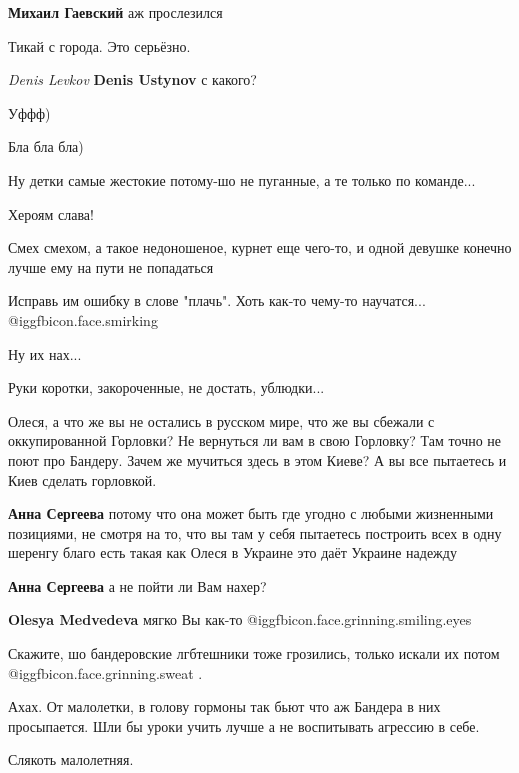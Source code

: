 \begin{itemize}
\begin{itemize}
\textbf{Михаил Гаевский} аж прослезился
\end{itemize} %

Тикай с города. Это серьёзно.

\emph{Denis Levkov}
\textbf{Denis Ustynov} с какого?

Уффф)

Бла бла бла)

Ну детки самые жестокие потому-шо не пуганные, а те только по команде...

Хероям слава!

Смех смехом, а такое недоношеное, курнет еще чего-то, и одной девушке конечно лучше ему на пути не попадаться

Исправь им ошибку в слове "плачь". Хоть как-то чему-то научатся... @igg{fbicon.face.smirking} 

Ну их нах...

Руки коротки, закороченные, не достать, ублюдки...


Олеся, а что же вы не остались в русском мире, что же вы сбежали с
оккупированной Горловки? Не вернуться ли вам в свою Горловку? Там точно не поют
про Бандеру. Зачем же мучиться здесь в этом Киеве? А вы все пытаетесь и Киев
сделать горловкой.

\begin{itemize} %
\textbf{Анна Сергеева} потому что она может быть где угодно с любыми жизненными позициями, не смотря на то, что вы там у себя пытаетесь построить всех в одну шеренгу
благо есть такая как Олеся в Украине
это даёт Украине надежду

\textbf{Анна Сергеева} а не пойти ли Вам нахер?

\textbf{Olesya Medvedeva} мягко Вы как-то @igg{fbicon.face.grinning.smiling.eyes} 
\end{itemize} %

Скажите, шо бандеровские лгбтешники тоже грозились, только искали их потом  @igg{fbicon.face.grinning.sweat} .


Ахах. От малолетки, в голову гормоны так бьют что аж Бандера в них просыпается.
Шли бы уроки учить лучше а не воспитывать агрессию в себе.

Слякоть малолетняя.

\end{itemize} %
